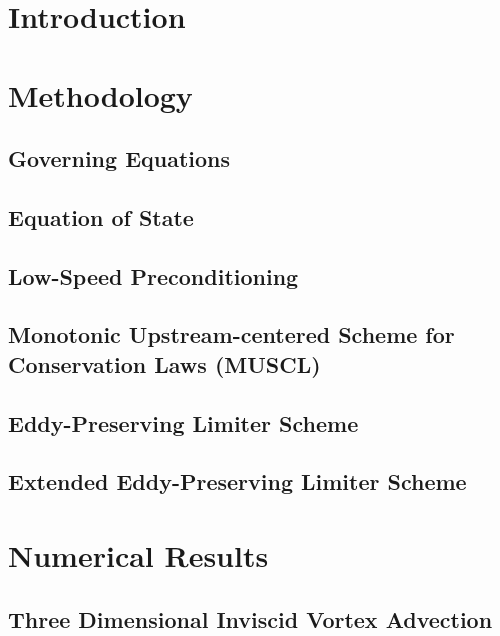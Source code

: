 \documentclass[twocolumn,10pt]{asme2ej}
\begin{document}
\section{Introduction}



\section{Methodology}

\subsection{Governing Equations}


\subsection{Equation of State}


\subsection{Low-Speed Preconditioning}


\subsection{Monotonic Upstream-centered Scheme for Conservation Laws (MUSCL)}


\subsection{Eddy-Preserving Limiter Scheme}


\subsection{Extended Eddy-Preserving Limiter Scheme}

\section{Numerical Results} 

\subsection{Three Dimensional Inviscid Vortex Advection}

\end{document}
